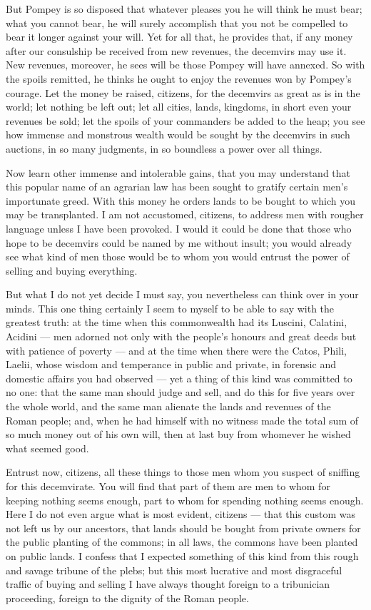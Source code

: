  But Pompey is so disposed that whatever pleases you he will think he must bear; what you cannot bear, he will surely accomplish that you not be compelled to bear it longer against your will. Yet for all that, he provides that, if any money after our consulship be received from new revenues, the decemvirs may use it. New revenues, moreover, he sees will be those Pompey will have annexed. So with the spoils remitted, he thinks he ought to enjoy the revenues won by Pompey's courage. Let the money be raised, citizens, for the decemvirs as great as is in the world; let nothing be left out; let all cities, lands, kingdoms, in short even your revenues be sold; let the spoils of your commanders be added to the heap; you see how immense and monstrous wealth would be sought by the decemvirs in such auctions, in so many judgments, in so boundless a power over all things.

 Now learn other immense and intolerable gains, that you may understand that this popular name of an agrarian law has been sought to gratify certain men's importunate greed. With this money he orders lands to be bought to which you may be transplanted. I am not accustomed, citizens, to address men with rougher language unless I have been provoked. I would it could be done that those who hope to be decemvirs could be named by me without insult; you would already see what kind of men those would be to whom you would entrust the power of selling and buying everything.

 But what I do not yet decide I must say, you nevertheless can think over in your minds. This one thing certainly I seem to myself to be able to say with the greatest truth: at the time when this commonwealth had its Luscini, Calatini, Acidini --- men adorned not only with the people's honours and great deeds but with patience of poverty --- and at the time when there were the Catos, Phili, Laelii, whose wisdom and temperance in public and private, in forensic and domestic affairs you had observed --- yet a thing of this kind was committed to no one: that the same man should judge and sell, and do this for five years over the whole world, and the same man alienate the lands and revenues of the Roman people; and, when he had himself with no witness made the total sum of so much money out of his own will, then at last buy from whomever he wished what seemed good.

 Entrust now, citizens, all these things to those men whom you suspect of sniffing for this decemvirate. You will find that part of them are men to whom for keeping nothing seems enough, part to whom for spending nothing seems enough. Here I do not even argue what is most evident, citizens --- that this custom was not left us by our ancestors, that lands should be bought from private owners for the public planting of the commons; in all laws, the commons have been planted on public lands. I confess that I expected something of this kind from this rough and savage tribune of the plebs; but this most lucrative and most disgraceful traffic of buying and selling I have always thought foreign to a tribunician proceeding, foreign to the dignity of the Roman people.

